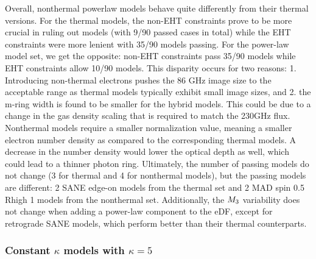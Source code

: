 Overall, \hamr nonthermal powerlaw models behave quite differently from their thermal versions.
For the thermal models, the non-EHT constraints prove to be more crucial in ruling out models (with 9/90 passed cases in total) while the EHT constraints were more lenient with 35/90 models passing.
For the power-law model set, we get the opposite: non-EHT constraints pass 35/90 models while EHT constraints allow 10/90 models.
This disparity occurs for two reasons:
1. Introducing non-thermal electrons pushes the 86 GHz image size to the acceptable range as thermal models typically exhibit small image sizes, and
2. the m-ring width is found to be smaller for the hybrid models.
This could be due to a change in the gas density scaling that is required to match the 230GHz flux.
Nonthermal models require a smaller normalization value, meaning a smaller electron number density as compared to the corresponding thermal models.
A decrease in the number density would lower the optical depth as well, which could lead to a thinner photon ring.
Ultimately, the number of passing models do not change (3 for thermal and 4 for nonthermal models), but the passing models are different: 2 SANE edge-on models from the thermal set and 2 MAD spin 0.5 Rhigh 1 models from the nonthermal set.
Additionally, the $M_{3}$ variability does not change when adding a power-law component to the eDF, except for retrograde SANE models, which perform better than their thermal counterparts.

\subsubsection{Constant \texorpdfstring{$\kappa$}{kappa} models with \texorpdfstring{$\kappa = 5$}{kappa = 5}}

